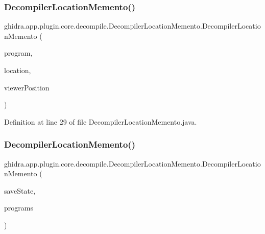 \subsubsection{\texorpdfstring{DecompilerLocationMemento()}{DecompilerLocationMemento()}\hspace{0.1cm}{\footnotesize\ttfamily [1/2]}}
{\footnotesize\ttfamily ghidra.\+app.\+plugin.\+core.\+decompile.\+Decompiler\+Location\+Memento.\+Decompiler\+Location\+Memento (\begin{DoxyParamCaption}\item[{Program}]{program,  }\item[{Program\+Location}]{location,  }\item[{Viewer\+Position}]{viewer\+Position }\end{DoxyParamCaption})\hspace{0.3cm}{\ttfamily [inline]}}



Definition at line 29 of file Decompiler\+Location\+Memento.\+java.

\mbox{\label{classghidra_1_1app_1_1plugin_1_1core_1_1decompile_1_1_decompiler_location_memento_aee736638d1946c497944955f90577efb}} 
\subsubsection{\texorpdfstring{DecompilerLocationMemento()}{DecompilerLocationMemento()}\hspace{0.1cm}{\footnotesize\ttfamily [2/2]}}
{\footnotesize\ttfamily ghidra.\+app.\+plugin.\+core.\+decompile.\+Decompiler\+Location\+Memento.\+Decompiler\+Location\+Memento (\begin{DoxyParamCaption}\item[{Save\+State}]{save\+State,  }\item[{Program \mbox{[}$\,$\mbox{]}}]{programs }\end{DoxyParamCaption})\hspace{0.3cm}{\ttfamily [inline]}}



